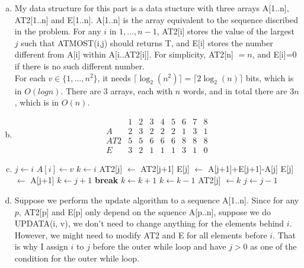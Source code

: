 \documentclass[10pt]{article}
\newcommand{\oor}{\mbox{ OR }}
\newcommand{\aand}{\mbox{ AND }}
\newcommand{\algorithmicbreak}{\textbf{break}}
\newcommand{\Break}{\State \algorithmicbreak}
\begin{document}
\begin{enumerate}[a.]
	\item %
		My data structure for this part is a data stucture with three arrays
		A[1..n], AT2[1..n] and E[1..n]. 
		A[1..n] is the array equivalent to the sequence discribed in the
		problem. 
		For any $i$ in $1, \ldots, n-1$, AT2[i] stores the value of the largest
		$j$ such that ATMOST(i,j) should returns T, and E[i] stores the number
		different from A[i] within A[i..AT2[i]]. 
		For simplicity, AT2[n] $= n$, and E[i]=0 if there is no such different
		number. \\

		For each $v \in \{1, \ldots, n^2\}$, it needs $\lceil \log_2(n^2)
		\rceil = \lceil 2\log_2(n) \rceil$ bits, which is in $O(log n)$. 
		There are 3 arrays, each with $n$ words, and in total there are $3n$,
		which is in $O(n)$. 

	\item %
		$$
		\begin{matrix}
				& 1 & 2 & 3 & 4 & 5 & 6 & 7 & 8 \\
			\hline
			A	& 2 & 3 & 2 & 2 & 2 & 1 & 3 & 1 \\
			AT2	& 5 & 5 & 6 & 6 & 6 & 8 & 8 & 8 \\
			E	& 3 & 2 & 1 & 1 & 1 & 3 & 1 & 0
		\end{matrix}
		$$
	\item %
		\begin{algorithmic}[1]
				\State $j \gets i$
				\State $A[i] \gets v$
				\State $k \gets i$
				\While{$j > 0 \aand k \geq i-1$}
						\If{A[j] = A[j+1] $\oor$ A[j] = E[j+1]}
							\State AT2[j] $\gets$ AT2[j+1]
							\State E[j] $\gets$ A[j+1]+E[j+1]-A[j]
						\Else
							\State E[j] $\gets$ A[j+1]
							\State $k \gets j+1$
								\If{A[k] $\neq$ A[j] $\aand$ A[k] $\neq$ E[j]}
									\Break
								\EndIf
								\State $k \gets k+1$
							\EndWhile
							\State $k \gets k-1$
							\State AT2[j] $\gets k$
						\EndIf
					\EndIf
					\State $j \gets j-1$
				\EndWhile
			\EndFunction
		\end{algorithmic}
	\item %
		Suppose we perform the update algorithm to a sequence A[1..n]. 
		Since for any $p$, AT2[p] and E[p] only depend on the squence A[p..n],
		suppose we do UPDATA(i, v), we don't need to change anything for the
		elements behind $i$. 
		However, we might need to modify AT2 and E for all elements before $i$.
		That is why I assign $i$ to $j$ before the outer while loop and have $j>0$
		as one of the condition for the outer while loop. 


\end{enumerate}
\end{document}
